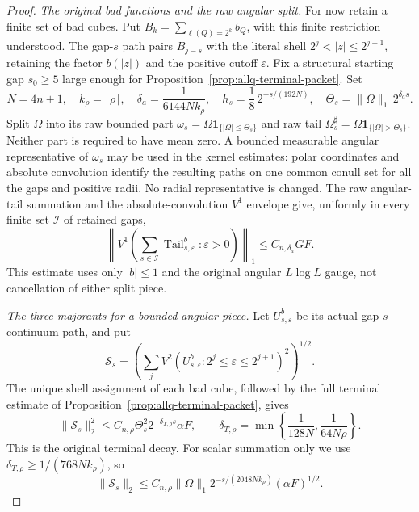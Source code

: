 \documentclass[11pt]{article}
\numberwithin{equation}{section}
\theoremstyle{remark}
\theoremstyle{definition}
\begin{document}
\begin{proof}
\emph{The original bad functions and the raw angular split.}
For now retain a finite set of bad cubes.  Put
$B_k=\sum_{\ell(Q)=2^k}b_Q$, with this finite restriction understood.
The gap-$s$ path pairs $B_{j-s}$ with the literal shell
$2^j<|z|\le2^{j+1}$, retaining the factor $b(|z|)$ and the positive
cutoff $\varepsilon$.  Fix a structural starting gap $s_0\ge5$ large
enough for Proposition~\ref{prop:allq-terminal-packet}.  Set
\begin{equation}\label{eq:allq-weak-parameters}
 N=4n+1,\quad k_\rho=\lceil\rho\rceil,\quad
 \delta_a=\frac1{6144Nk_\rho},\quad
 h_s=\frac18\,2^{-s/(192N)},\quad
 \Theta_s=\|\Omega\|_1\,2^{\delta_as}.
\end{equation}
Split $\Omega$ into its raw bounded part
$\omega_s=\Omega\mathbf1_{\{|\Omega|\le\Theta_s\}}$ and raw tail
$\Omega_s^\sharp=\Omega\mathbf1_{\{|\Omega|>\Theta_s\}}$.
Neither part is required to have mean zero.  A bounded measurable angular
representative of $\omega_s$ may be used in the kernel estimates:
polar coordinates and absolute convolution identify the resulting
paths on one common conull set for all the gaps and positive radii.
No radial representative is changed.
The raw angular-tail summation and the absolute-convolution $V^1$
envelope give, uniformly in every finite set $\mathcal I$ of retained
gaps,
\[
 \left\|V^1\left(\sum_{s\in\mathcal I}
       \operatorname{Tail}_{s,\varepsilon}^{b}:
       \varepsilon>0\right)\right\|_1
 \le C_{n,\delta_a}GF.
\]
This estimate uses only $|b|\le1$ and the original angular $L\log L$
gauge, not cancellation of either split piece.

\emph{The three majorants for a bounded angular piece.}
Let $U_{s,\varepsilon}^b$ be its actual gap-$s$ continuum path, and put
\[
 \mathcal S_s=
 \left(\sum_j V^2(U_{s,\varepsilon}^b:
                 2^j\le\varepsilon\le2^{j+1})^2\right)^{1/2}.
\]
The unique shell assignment of each bad cube, followed by the full
terminal estimate of Proposition~\ref{prop:allq-terminal-packet}, gives
\begin{equation}\label{eq:allq-weak-short-decay}
 \|\mathcal S_s\|_2^2
 \le C_{n,\rho}\Theta_s^2
     2^{-\delta_{T,\rho}s}\alpha F,
 \qquad
 \delta_{T,\rho}=\min\left\{\frac1{128N},\frac1{64N\rho}\right\}.
\end{equation}
This is the original terminal decay.  For scalar summation only we use
$\delta_{T,\rho}\ge1/(768Nk_\rho)$, so
\[
 \|\mathcal S_s\|_2
 \le C_{n,\rho}\|\Omega\|_1
        2^{-s/(2048Nk_\rho)}(\alpha F)^{1/2}.
\]


\end{proof}
\end{document}

